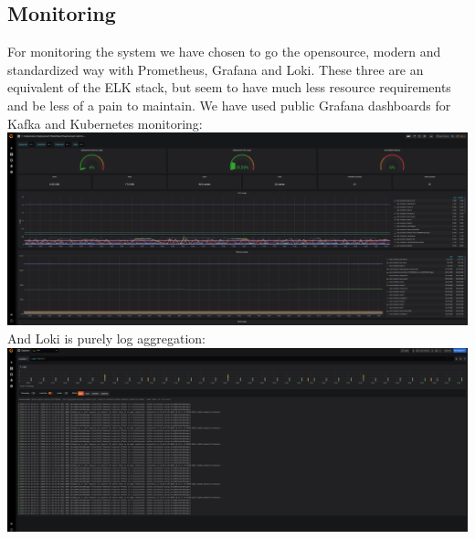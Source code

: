 \subsection{Monitoring}
For monitoring the system we have chosen to go the opensource, modern and standardized way with Prometheus, Grafana and Loki.
These three are an equivalent of the ELK stack, but seem to have much less resource requirements and be less of a pain to maintain.
We have used public Grafana dashboards for Kafka and Kubernetes monitoring:\\
\includegraphics[scale=0.133]{grafana.png}\\
And Loki is purely log aggregation:\\
\includegraphics[scale=0.133]{loki.png}\\
